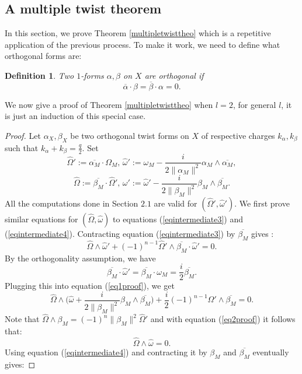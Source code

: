 \documentclass[12pt, reqno]{amsart}
\newtheorem{Def}{Definition}[subsection]
\begin{document}
\subsection{A multiple twist theorem}
In this section, we prove Theorem \ref{multipletwisttheo} which is a repetitive application of the previous process. To make it work, we need to define what orthogonal forms are:
\begin{Def}\label{orthogonaldef}
    Two $1$-forms $\alpha,\beta$ on $X$ are orthogonal if \[\overline{\alpha}\cdot\beta=\overline{\beta}\cdot\alpha=0.\]
\end{Def}
\indent We now give a proof of Theorem \ref{multipletwisttheo} when $l=2$, for general $l$, it is just an induction of this special case.
\begin{proof}
    Let $\alpha_X,\beta_X$ be two orthogonal twist forms on $X$ of respective charges $k_\alpha,k_\beta$ such that $k_\alpha+k_\beta=\frac{q}{2}$. Set \[\hat\Omega':=\overline{\alpha_M}\cdot\Omega_M,\,\hat\omega':=\omega_M-\frac{i}{2\|\alpha_M\|^2}\alpha_M\wedge\overline{\alpha_M} ,\]\[\hat\Omega:=\overline{\beta_M}\cdot\hat\Omega',\,\omega':=\hat\omega'-\frac{i}{2\|\beta_M\|^2}\beta_M\wedge\overline{\beta_M}.\]
    All the computations done in Section $2.1$ are valid for $(\hat\Omega',\hat\omega')$. We first prove similar equations for $(\hat\Omega,\hat\omega)$ to equations (\ref{eqintermediate3}) and (\ref{eqintermediate4}). Contracting equation (\ref{eqintermediate3}) by $\overline{\beta_M}$ gives :
    \begin{equation}\label{eq1proof}
        \hat\Omega\wedge\hat\omega'+(-1)^{n-1}\hat\Omega'\wedge\overline{\beta_M}\cdot\hat\omega'=0.
    \end{equation}
    By the orthogonality assumption, we have \[\overline{\beta_M}\cdot\hat\omega'=\overline{\beta_M}\cdot\omega_M=\frac{i}{2}\overline{\beta_M}.\]
    Plugging this into equation (\ref{eq1proof}), we get 
    \begin{equation}\label{eq2proof}
        \hat\Omega\wedge\bigg(\hat\omega+\frac{i}{2\|\beta_M\|^2}\beta_M\wedge\overline{\beta_M}\bigg)+\frac{i}{2}(-1)^{n-1}\hat\Omega'\wedge\overline{\beta_M}=0.
    \end{equation}
    Note that $\hat\Omega\wedge\beta_M=(-1)^n\|\beta_M\|^2\hat\Omega'$ and with equation (\ref{eq2proof}) it follows that: \begin{equation}\label{eq3proof}
        \hat\Omega\wedge\hat\omega=0.
    \end{equation}
    Using equation (\ref{eqintermediate4}) and contracting it by $\beta_M$ and $\overline{\beta_M}$ eventually gives:

\end{proof}
\end{document}
